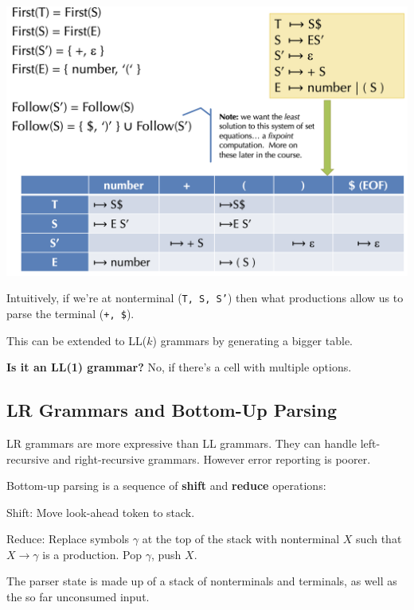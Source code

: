 \begin{center}
	\includegraphics[width=\linewidth]{assets/ll1.png}
\end{center}
\vspace{-10pt}
Intuitively, if we're at nonterminal (\texttt{T, S, S'}) then what productions allow us to parse the terminal (\texttt{+, \$}).

This can be extended to LL($k$) grammars by generating a bigger table.

\textbf{Is it an LL(1) grammar?} No, if there's a cell with multiple options.

\subsection*{LR Grammars and Bottom-Up Parsing}

LR grammars are more expressive than LL grammars. They can handle left-recursive and right-recursive grammars. However error reporting is poorer. \medskip

Bottom-up parsing is a sequence of \textbf{shift} and \textbf{reduce} operations:
\begin{compactitem}[$\quad\bullet$]
	\item Shift: Move look-ahead token to stack.

	\item Reduce: Replace symbols $\gamma$ at the top of the stack with nonterminal $X$ such that $X \to \gamma$ is a production. Pop $\gamma$, push $X$.
\end{compactitem}

The parser state is made up of a stack of nonterminals and terminals, as well as the so far unconsumed input.\medskip

